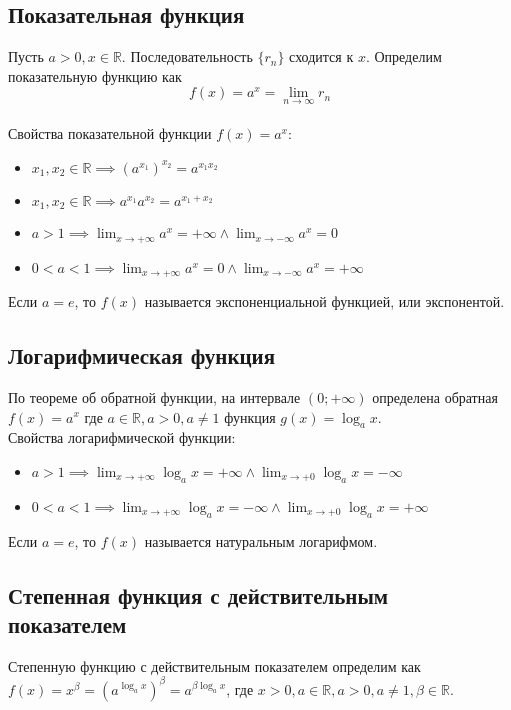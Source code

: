 \documentclass{article}
\newcommand{\seq}[1]{$\{#1\}$}
\newcommand{\intr}[2]{$(#1;#2)$}
\begin{document}
        \subsection*{Показательная функция}
        Пусть $a > 0, x \in \mathbb{R}$. Последовательность \seq{r_n} сходится к $x$. Определим показательную функцию как 
        \[ f(x) = a^x = \lim_{n \to \infty} r_n \]
        \\
        Свойства показательной функции $f(x) = a^x$:
        \begin{itemize}
            \item $ x_1, x_2 \in \mathbb{R} \implies {\left( a^{x_1} \right)}^{x_2} = a^{x_1x_2} $
            \item $ x_1, x_2 \in \mathbb{R} \implies a^{x_1}a^{x_2} = a^{x_1 + x_2} $
            \item $ a > 1 \implies \lim_{x \to +\infty} a^x = +\infty \land \lim_{x \to -\infty} a^x = 0 $
            \item $ 0 < a < 1 \implies \lim_{x \to +\infty} a^x = 0 \land \lim_{x \to -\infty} a^x = +\infty $
        \end{itemize}
        Если $a = e$, то $f(x)$ называется экспоненциальной функцией, или экспонентой.
        
        \subsection*{Логарифмическая функция}
        По теореме об обратной функции, на интервале \intr{0}{+\infty} определена обратная $ f(x) = a^x$ где $a \in \mathbb{R}, a > 0, a \neq 1 $
        функция $g(x) = \log_a x$.
        \\
        Свойства логарифмической функции:
        \begin{itemize}
            \item $ a > 1 \implies \lim_{x \to +\infty} \log_a x = +\infty \land \lim_{x \to +0} \log_a x = -\infty $
            \item $ 0 < a < 1 \implies \lim_{x \to +\infty} \log_a x = -\infty \land \lim_{x \to +0} \log_a x = +\infty $
        \end{itemize}
        Если $a = e$, то $f(x)$ называется натуральным логарифмом.
        
        \subsection*{Степенная функция с действительным показателем}
        Степенную функцию с действительным показателем определим как $f(x) = x^{\beta} = {\left( a^{\log_a x} \right)}^\beta = a^{\beta \log_a x}$, 
        где $x > 0, a \in \mathbb{R}, a > 0, a \neq 1, \beta \in \mathbb{R}.$
\end{document}
